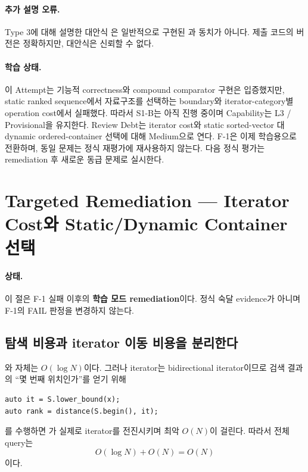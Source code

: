 \paragraph{추가 설명 오류.}
Type 3에 대해 설명한 대안식
은 일반적으로 구현된
과 동치가 아니다. 제출 코드의  버전은 정확하지만, 대안식은 신뢰할 수 없다.

\paragraph{학습 상태.}
이 Attempt는 기능적 correctness와 compound comparator 구현은 입증했지만, static ranked sequence에서 자료구조를 선택하는 boundary와 iterator-category별 operation cost에서 실패했다. 따라서 S1-B는 아직 진행 중이며 Capability는 L3 / Provisional을 유지한다. Review Debt는 iterator cost와 static sorted-vector 대 dynamic ordered-container 선택에 대해 Medium으로 연다. F-1은 이제 학습용으로 전환하며, 동일 문제는 정식 재평가에 재사용하지 않는다. 다음 정식 평가는 remediation 후 새로운 동급 문제로 실시한다.


\section{Targeted Remediation --- Iterator Cost와 Static/Dynamic Container 선택}

\paragraph{상태.}
이 절은 F-1 실패 이후의 \textbf{학습 모드 remediation}이다. 정식 숙달 evidence가 아니며 F-1의 FAIL 판정을 변경하지 않는다.

\subsection{탐색 비용과 iterator 이동 비용을 분리한다}

와  자체는 $O(\log N)$이다. 그러나  iterator는 bidirectional iterator이므로 검색 결과의 ``몇 번째 위치인가''를 얻기 위해
\begin{lstlisting}
auto it = S.lower_bound(x);
auto rank = distance(S.begin(), it);
\end{lstlisting}
를 수행하면 가 실제로 iterator를 전진시키며 최악 $O(N)$이 걸린다. 따라서 전체 query는
\[
O(\log N)+O(N)=O(N)
\]
이다.

